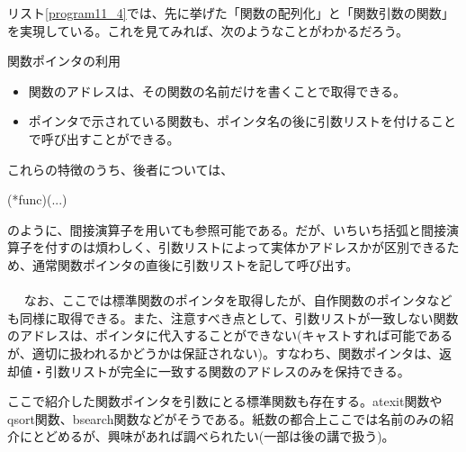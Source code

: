 リスト\ref{program11_4}では、先に挙げた「関数の配列化」と「関数引数の関数」を実現している。これを見てみれば、次のようなことがわかるだろう。
\begin{itembox}[l]{関数ポインタの利用}
\begin{itemize}
\item 関数のアドレスは、その関数の名前だけを書くことで取得できる。
\item ポインタで示されている関数も、ポインタ名の後に引数リストを付けることで呼び出すことができる。
\end{itemize}
\end{itembox}

これらの特徴のうち、後者については、
\begin{code}
(*func)(...)
\end{code}
のように、間接演算子を用いても参照可能である。だが、いちいち括弧と間接演算子を付すのは煩わしく、引数リストによって実体かアドレスかが区別できるため、通常関数ポインタの直後に引数リストを記して呼び出す。
\\ \\　
なお、ここでは標準関数のポインタを取得したが、自作関数のポインタなども同様に取得できる。また、注意すべき点として、引数リストが一致しない関数のアドレスは、ポインタに代入することができない(キャストすれば可能であるが、適切に扱われるかどうかは保証されない)。すなわち、関数ポインタは、返却値・引数リストが完全に一致する関数のアドレスのみを保持できる。

ここで紹介した関数ポインタを引数にとる標準関数も存在する。atexit関数やqsort関数、bsearch関数などがそうである。紙数の都合上ここでは名前のみの紹介にとどめるが、興味があれば調べられたい(一部は後の講で扱う)。

